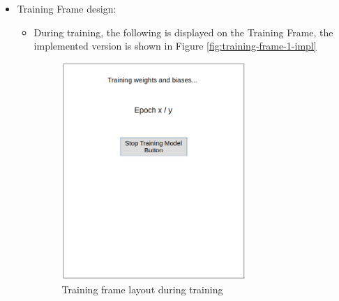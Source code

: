 \documentclass[./project-report/src/latex/project-report.tex]{subfiles}
\begin{document}
\begin{itemize}
    \pagebreak

    \item Training Frame design: 
        \begin{itemize}
            \item During training, the following is displayed on the Training Frame, the implemented version is shown in Figure \ref{fig:training-frame-1-impl}
                \begin{figure}[h!]
                \centering
                \includegraphics[width=0.7\textwidth]{./project-report/src/images/training-frame-1-design.png}
                \caption{Training frame layout during training}
                \label{fig:training-frame-1-design}
                \end{figure}

            \pagebreak


\end{itemize}
\end{itemize}
\end{document}
